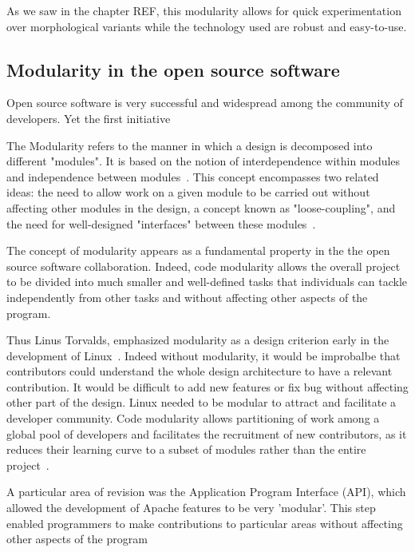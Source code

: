 As we saw in the chapter REF, this modularity allows for quick experimentation over morphological variants while the technology used are robust and easy-to-use.


\subsection{Modularity in the open source software} %

Open source software is very successful and widespread among the community of developers. Yet the first initiative

The Modularity refers to the manner in which a design is decomposed into different "modules". It is based on the notion of interdependence within modules and independence between modules~\cite{baldwin2000design}. This concept encompasses two related ideas: the need to allow work on a given module to be carried out without affecting other modules in the design, a concept known as "loose-coupling", and the need for well-designed "interfaces" between these modules~\cite{maccormack2006exploring}.

The concept of modularity appears as a fundamental property in the the open source software collaboration. Indeed, code modularity allows the overall project to be divided into much smaller and well-defined tasks that individuals can tackle independently from other tasks and without affecting other aspects of the program.

Thus Linus Torvalds, emphasized modularity as a design criterion early in the development of Linux~\cite{dibona1999open}. Indeed without modularity, it would be improbalbe that contributors could understand the whole design architecture to have a relevant contribution. It would be difficult to add new features or fix bug without affecting other part of the design. Linux needed to be modular to attract and facilitate a developer community. Code modularity allows partitioning of work among a global pool of developers and facilitates the recruitment of new contributors, as it reduces their learning curve to a subset of modules rather than the entire project~\cite{fitzgerald2004critical}.

\cite{lerner2002some}
A particular area of revision was the Application Program Interface (API), which allowed the development of Apache features to be very 'modular'. This step enabled programmers to make contributions to particular areas without affecting other aspects of the program



